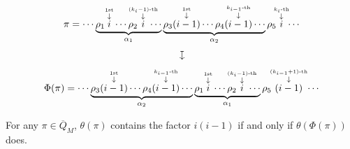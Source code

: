 \documentclass[10pt,a4paper]{amsart}
\def\oQ{\overline{Q}}
\begin{document}
\begin{gather}
\pi=\cdots \underbrace{\rho_1
	\overset{\overset{\text{1st}}{\downarrow}}{i}
	\cdots
\rho_2
\mkern-17mu \overset{\overset{(k_i-1)\text{-th}}{\downarrow}}{i}\mkern-17mu
\cdots}_{\alpha_1}
\underbrace{\rho_3
	\overset{\overset{\text{1st}}{\downarrow}}{(i-1)}
	\cdots
\rho_4
\overset{\overset{k_{i-1}\text{-th}}{\downarrow}}{(i-1)}
\cdots}_{\alpha_2}
\rho_5
\mkern-5mu
\overset{\overset{k_i\text{-th}}{\downarrow}}{i}
\mkern-5mu
\cdots\nonumber\\
%
\rotatebox[origin=c]{-90}{\ $\mapsto$\ }\nonumber\\
%
\Phi(\pi)=\cdots \underbrace{\rho_3
	\overset{\overset{\text{1st}}{\downarrow}}{(i-1)}
	\cdots
\rho_4
\overset{\overset{k_{i-1}\text{-th}}{\downarrow}}{(i-1)}
\cdots
}_{\alpha_2}
\underbrace{\rho_1
	\overset{\overset{\text{1st}}{\downarrow}}{i}
	\cdots
\rho_2
\mkern-17mu
\overset{\overset{(k_{i}-1)\text{-th}}{\downarrow}}{i}
\mkern-17mu
\cdots
}_{\alpha_1}
\rho_5
\mkern-3mu
\overset{\overset{(k_{i-1}+1)\text{-th}}{\downarrow}}{(i-1)}
\mkern-3mu
\cdots\label{EQ:form-case2.3}
\end{gather}

\begin{lem}\label{LEM:factor-keep}
	For any $\pi\in\oQ_M$, $\theta(\pi)$ contains the factor $i(i-1)$ if and only if $\theta(\Phi(\pi))$ does.
\end{lem}
\end{document}
